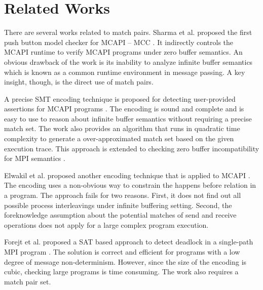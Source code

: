 \section{Related Works}
There are several works related to match pairs.
Sharma et al. proposed the first push button model checker for MCAPI -- MCC \cite{DBLP:conf/fmcad/SharmaGMH09}. It indirectly controls the MCAPI runtime to verify MCAPI programs under zero buffer semantics. An obvious drawback of the work is its inability to analyze infinite buffer semantics which is known as a common runtime environment in message passing. A key insight, though, is the direct use of match pairs.

A precise SMT encoding technique is proposed for detecting user-provided assertions for MCAPI programs \cite{DBLP:conf/kbse/HuangMM13}. The encoding is sound and complete and is easy to use to reason about infinite buffer semantics without requiring a precise match set. The work also provides an algorithm that runs in quadratic time complexity to generate a over-approximated match set based on the given execution trace. This approach is extended to checking zero buffer incompatibility for MPI semantics \cite{HuangNFM15}. 

Elwakil et al. proposed another encoding technique that is applied to MCAPI \cite{DBLP:conf/atva/ElwakilYW10,DBLP:conf/issta/ElwakilY10}. The encoding uses a non-obvious way to constrain the happens before relation in a program. The approach fails for two reasons. First, it does not find out all possible process interleavings under infinite buffering setting. Second, the foreknowledge assumption about the potential matches of send and receive operations does not apply for a large complex program execution. 


Forejt et al. proposed a SAT based approach to detect deadlock in a single-path MPI program \cite{DBLP:conf/fm/ForejtKNS14}. The solution is correct and efficient for programs with a low degree of message non-determinism. However, since the size of the encoding is cubic, checking large programs is time consuming. The work also requires a match pair set.

